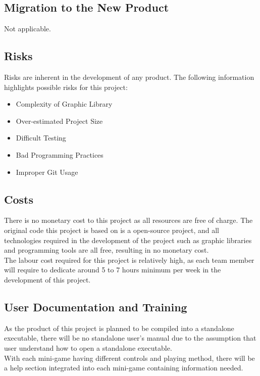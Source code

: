 \documentclass[12pt, titlepage]{article}
\begin{document}
\subsection{Migration to the New Product}

Not applicable.

\subsection{Risks}

Risks are inherent in the development of any product. The following information highlights possible risks for this project:
\begin{itemize}
    \item Complexity of Graphic Library
    \item Over-estimated Project Size
    \item Difficult Testing
    \item Bad Programming Practices
    \item Improper Git Usage
\end{itemize}

\subsection{Costs}

There is no monetary cost to this project as all resources are free of charge. The original code this project is based on is a open-source project, and all technologies required in the development of the project such as graphic libraries and programming tools are all free, resulting in no monetary cost.\\
The labour cost required for this project is relatively high, as each team member will require to dedicate around 5 to 7 hours minimum per week in the development of this project.

\subsection{User Documentation and Training}

As the product of this project is planned to be compiled into a standalone executable, there will be no standalone user's manual due to the assumption that user understand how to open a standalone executable.\\
With each mini-game having different controls and playing method, there will be a help section integrated into each mini-game containing information needed.
\end{document}
